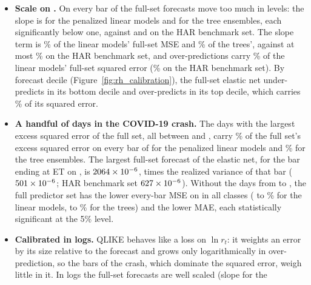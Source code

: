 \begin{itemize}
  \rhcaLinFullMzBBarPreRng, not significantly different from one.
\item \textbf{Scale on \rhcaYearsOos.} On every bar of \rhcaYearsOos{} the full-set forecasts move too much in levels:
  the slope is \rhcaLinFullMzBBarOosRng{} for the penalized linear models and \rhcaTreeFullMzBBarOosRng{} for the tree
  ensembles, each significantly below one, against \rhcaLinHarMzBBarOos{} and \rhcaTreeHarMzBBarOosRng{} on the HAR
  benchmark set. The slope term is \rhcaLinFullShSlopeBarOosRng\% of the linear models' full-set MSE and
  \rhcaTreeFullShSlopeBarOosRng\% of the trees', against at most \rhcaAllHarShSlopeBarOosMax\% on the HAR benchmark
  set, and over-predictions carry \rhcaLinFullOverSeBarOosRng\% of the linear models' full-set squared error
  (\rhcaAllHarOverSeBarOosRng\% on the HAR benchmark set). By forecast decile (Figure~\ref{fig:rh_calibration}), the
  full-set elastic net under-predicts in its bottom decile and over-predicts in its top decile, which carries
  \rhcaTopDecSeEnetFullBarOos\% of its squared error.
\item \textbf{A handful of days in the COVID-19 crash.} The \rhcaTopDays{} days with the largest excess squared error of
  the full set, all between \rhcaTopFirstBarOos{} and \rhcaTopLastBarOos, carry \rhcaLinTopShareBarOosRng\% of the full
  set's excess squared error on every bar of \rhcaYearsOos{} for the penalized linear models and
  \rhcaTreeTopShareBarOosRng\% for the tree ensembles. The largest full-set forecast of the elastic net, for the bar
  ending at \rhcaMaxFcClock{} ET on \rhcaMaxFcDate, is $2064 \times 10^{-6}$,
  \rhcaMaxFcRatioEnet{} times the realized variance of that bar ($501 \times 10^{-6}$; HAR
  benchmark set $627 \times 10^{-6}$). Without the days from \rhcaCrashStart{} to
  \rhcaCrashEnd, the full predictor set has the lower every-bar MSE on \rhcaYearsOos{} in all \rhorAfPairs{} classes
  (\rhcaLinMsePctBarOosExCrashMin{} to \rhcaLinMsePctBarOosExCrashMax\% for the linear models,
  \rhcaTreeMsePctBarOosExCrashMin{} to \rhcaTreeMsePctBarOosExCrashMax\% for the trees) and the lower MAE, each
  statistically significant at the 5\% level.
\item \textbf{Calibrated in logs.} QLIKE behaves like a loss on $\ln r_t$: it weights an error by its size relative to
  the forecast and grows only logarithmically in over-prediction, so the bars of the crash, which dominate the squared
  error, weigh little in it. In logs the full-set forecasts are well scaled (slope \rhcaLinFullMzlBBarOosRng{} for the

\end{itemize}
